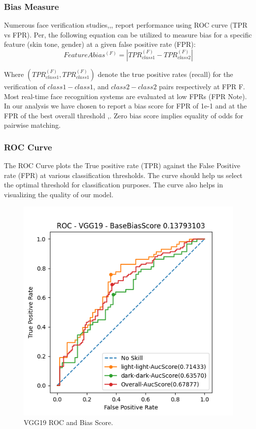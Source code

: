 \documentclass[conference]{IEEEtran}
\begin{document}
\subsubsection{Bias Measure}
Numerous face verification studies\cite{deng2019arcface},\cite{ranjan2019fast},\cite{liu2017sphereface},\cite{dhar2019measuring} report performance using ROC curve (TPR vs FPR). Per\cite{dhar2022distill},\cite{dhar2021pass} the following equation can be utilized to measure bias for a specific feature (skin tone, gender) at a given false positive rate (FPR):
\begin{equation}
    {Feature A  bias^{(F)}=\left|TPR_{class1}^{(F)} - TPR_{class2}^{(F)}\right|} 
\end{equation}

Where $(TPR_{class1}^{(F)}, TPR_{class1}^{(F)})$ denote the true positive rates (recall) for the verification of $class1-class1$, and $class2-class2$ pairs respectively at FPR F. Most real-time face recognition systems are evaluated at low FPRs (FPR Note). In our analysis we have chosen to report a bias score for FPR of 1e-1 and at the FPR of the best overall threshold \cite{dhar2022distill},\cite{dhar2021pass}. Zero bias score implies equality of odds for pairwise matching.

\subsubsection{ROC Curve}
The ROC Curve plots the True positive rate (TPR) against the False Positive rate (FPR) at various classification thresholds. The curve should help us select the optimal threshold for classification purposes. The curve also helps in visualizing the  quality of our model. 

\begin{figure}[htbp]
    \centerline{\includegraphics[width=0.9\linewidth]{latex/images/VGG19.png}}
    \caption{VGG19 ROC and Bias Score.}
    \label{vgg19_roc}
\end{figure}
\end{document}
